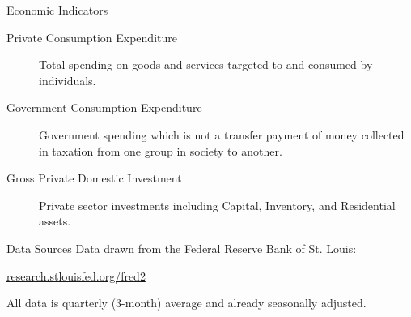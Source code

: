\begin{frame}{Economic Indicators}
    \begin{description}
        \item [Private Consumption Expenditure]
            Total spending on goods and services targeted to and consumed by individuals.
        \item [Government Consumption Expenditure]
            Government spending which is not a transfer payment of money collected 
            in taxation from one group in society to another.
        \item [Gross Private Domestic Investment]
            Private sector investments including Capital, Inventory, and Residential assets.
    \end{description}
\end{frame}

\begin{frame}{Data Sources}
    Data drawn from the Federal Reserve Bank of St. Louis:
    
    \begin{center} \url{research.stlouisfed.org/fred2} \end{center}

    All data is quarterly (3-month) average and already seasonally adjusted.
\end{frame}